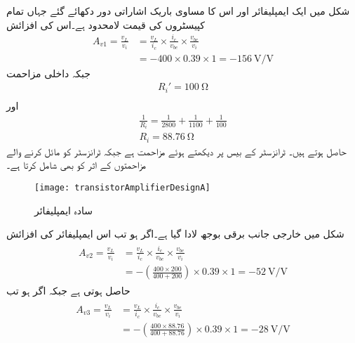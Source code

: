 
شکل  میں ایک ایمپلیفائر اور اس کا مساوی باریک اشاراتی دور دکھائے گئے جہاں تمام کپیسٹروں کی قیمت لامحدود ہے۔اس کی افزائش
\begin{align*}
A_{v1}=\frac{v_L}{v_i}&=\frac{v_L}{i_c} \times \frac{i_c}{v_{be}} \times \frac{v_{be}}{v_i}\\
&=-400 \times 0.39 \times 1=\SI[per=frac,fraction=nice]{-156}{\volt \per \volt}
\end{align*}
جبکہ داخلی مزاحمت 
\begin{align*}
R_i'=\SI{100}{\ohm}\\
\end{align*}
اور 
\begin{align*}
\frac{1}{R_i}=\frac{1}{2800}+\frac{1}{1100}+\frac{1}{100}\\
R_i=\SI{88.76}{\ohm}
\end{align*}
حاصل ہوتے ہیں۔ ٹرانزسٹر کے بیس پر دیکھتے ہوئے مزاحمت ہے جبکہ  ٹرانزسٹر کو مائل کرنے والے مزاحمتوں کے اثر کو بھی شامل کرتا ہے۔
%
\begin{figure}
\centering
\texttt{[image: transistorAmplifierDesignA]}
\caption{سادہ ایمپلیفائر}
\label{شکل_سادہ_ایمپلیفائر_بار_کے_اثرات_الف}
\end{figure}
شکل  میں خارجی جانب برقی بوجھ  لادا گیا ہے۔اگر  ہو تب اس ایمپلیفائر کی افزائش
\begin{gather}
\begin{aligned}\label{مساوات_ٹرانزسٹر_بار_کا_افزائش_پر_اثر_الف}
A_{v2}=\frac{v_L}{v_i}&=\frac{v_L}{i_c} \times \frac{i_c}{v_{be}} \times \frac{v_{be}}{v_i}\\
&=-\left(\frac{400 \times 200}{400+200} \right) \times 0.39 \times 1=\SI[per=frac,fraction=nice]{-52}{\volt \per \volt}
\end{aligned}
\end{gather}
حاصل ہوتی ہے جبکہ اگر  ہو تب
\begin{gather}
\begin{aligned}\label{مساوات_ٹرانزسٹر_بار_کا_افزائش_پر_اثر_ب}
A_{v3}=\frac{v_L}{v_i}&=\frac{v_L}{i_c} \times \frac{i_c}{v_{be}} \times \frac{v_{be}}{v_i}\\
&=-\left(\frac{400 \times 88.76}{400+88.76} \right) \times 0.39 \times 1=\SI[per=frac,fraction=nice]{-28}{\volt \per \volt}
\end{aligned}
\end{gather}
